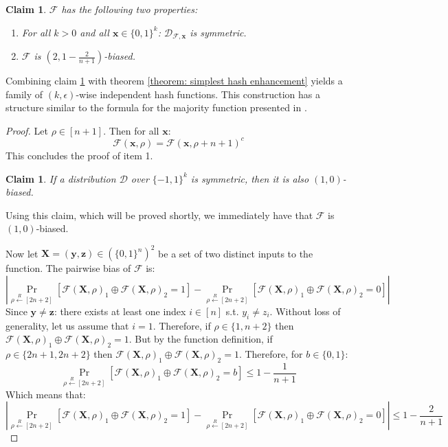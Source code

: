 \documentclass[12pt]{article}
\newtheorem{claim}[theorem]{Claim}
\newcommand{\zo}[1]{\{0,1\}^{#1}}
\newcommand{\oo}[1]{\{-1,1\}^{#1}}
\newcommand{\dist}{\mathcal{D}}
\newcommand{\F}{\mathcal{F}}
\newcommand{\rand}{\overset{R}{\leftarrow}}
\newcommand{\abs}[1]{\left| #1 \right|}
\renewcommand{\vec}[1]{\bm{#1}}
\begin{document}
	\begin{claim} \label{claim: bias of basic Valiant hash}
		$\F$ has the following two properties:
		\begin{enumerate}
			\item For all $k>0$ and all $\vec{x} \in \zo{k}$: $\dist_{\F,\vec{x}}$ is symmetric.
			\item $\F$ is $(2,1 - \frac{2}{n+1})$-biased.
		\end{enumerate}
	\end{claim}
	
	Combining claim \ref{claim: bias of basic Valiant hash} with theorem \ref{theorem: simplest hash enhancement} yields a family of $(k, \epsilon)$-wise independent hash functions. This construction has a structure similar to the formula for the majority function presented in \cite{Valiant}.
	
	\begin{proof}
		
		Let $\rho \in \left[n+1\right]$. 
		Then for all $\vec{x}$:
		\begin{equation*}
			\F(\vec{x}, \rho) = \F(\vec{x}, \rho + n + 1)^c
		\end{equation*}
		This concludes the proof of item 1.
		
		\begin{claim} \label{claim: symmetry yields (1,0)-bias}
			If a distribution $\dist$ over $\oo{k}$ is symmetric, then it is also $(1,0)$-biased.
		\end{claim}
		Using this claim, which will be proved shortly, we immediately have that $\F$ is $(1,0)$-biased.
		
		Now let $\vec{X} = \left(\vec{y}, \vec{z}\right) \in (\zo{n})^2$ be a set of two distinct inputs to the function.
		The pairwise bias of $\F$ is:
		\begin{equation*}
			\abs{\Pr_{\rho \rand \left[ 2n+2 \right]} \left[ \F(\vec{X}, \rho)_1 \oplus \F(\vec{X}, \rho)_2 = 1 \right]
			- \Pr_{\rho \rand \left[ 2n+2 \right]} \left[ \F(\vec{X}, \rho)_1 \oplus \F(\vec{X}, \rho)_2 = 0 \right]}
		\end{equation*}
		Since $\vec{y} \neq \vec{z}$: there exists at least one index $i \in \left[n\right]$ s.t. $y_i \neq z_i$.
		Without loss of generality, let us assume that $i=1$.
		Therefore, if $\rho \in \{1, n+2\}$ then $\F(\vec{X}, \rho)_1 \oplus \F(\vec{X}, \rho)_2 = 1$.
		But by the function definition, if $\rho \in \{2n+1, 2n+2\}$ then $\F(\vec{X}, \rho)_1 \oplus \F(\vec{X}, \rho)_2 = 1$.
		Therefore, for $b \in \{0,1\}$:
		\begin{equation*}
			\Pr_{\rho \rand \left[ 2n+2 \right]} \left[ \F(\vec{X}, \rho)_1 \oplus \F(\vec{X}, \rho)_2 = b \right] \leq 1 - \frac{1}{n+1}
		\end{equation*}
		Which means that:
		\begin{equation*}
		\abs{\Pr_{\rho \rand \left[ 2n+2 \right]} \left[ \F(\vec{X}, \rho)_1 \oplus \F(\vec{X}, \rho)_2 = 1 \right]
			- \Pr_{\rho \rand \left[ 2n+2 \right]} \left[ \F(\vec{X}, \rho)_1 \oplus \F(\vec{X}, \rho)_2 = 0 \right]}
		\leq 1 - \frac{2}{n+1}
		\end{equation*}
		
	\end{proof}
	
\end{document}
